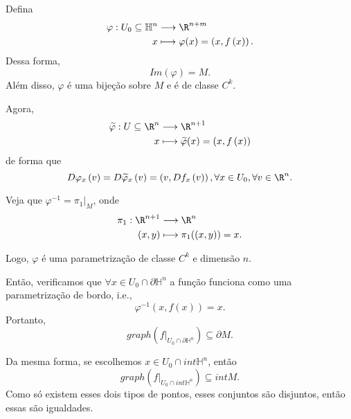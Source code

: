 \begin{demo}
    Defina
    \begin{align*}
        \varphi : U_0\subseteq\mathbb{H}^{n} &\longrightarrow \R^{n+m} \\
        x &\longmapsto \varphi (x) = \left( x, f\left( x \right)  \right)
    .\end{align*}
    Dessa forma, \[
    Im\left( \varphi  \right) = M
    .\] Além disso, $\varphi $ é uma bijeção sobre $M$ e é de classe $C^{k}$.

    Agora, 
    \begin{align*}
        \widetilde{\varphi }: U\subseteq\R^{n} &\longrightarrow \R^{n+1} \\
        x &\longmapsto \widetilde{\varphi }(x) = \left( x, f\left( x \right)  \right)
    \end{align*}
    de forma que \[
    D\varphi _x\left( v \right) = D \widetilde{\varphi }_x\left( v \right) = \left( v, Df_x\left( v \right)  \right), \forall x\in U_0, \forall v\in \R^{n}
    .\] 

    Veja que $\varphi ^{-1} = \pi_1\Big|_M$, onde
    \begin{align*}
        \pi_1: \R^{n+1} &\longrightarrow \R^{n} \\
        \left( x,y \right)  &\longmapsto \pi_1(\left( x,y \right) ) = x
    .\end{align*}

    Logo, $\varphi $ é uma parametrização de classe $C^{k}$ e dimensão $n$.

    Então, verificamos que $\forall x\in U_0\cap \partial \mathbb{H}^{n}$ a função funciona como uma parametrização de bordo, i.e., \[
    \varphi ^{-1}\left( x, f\left( x \right)  \right) = x
    .\] Portanto, \[
    graph\left( f\Big|_{U_0\cap \partial \mathbb{H}^{n}} \right) \subseteq \partial M
    .\] 

    Da mesma forma, se escolhemos $x \in U_0\cap int \mathbb{H}^{n}$, então \[
    graph\left( f\Big|_{U_0\cap int \mathbb{H}^{n}} \right) \subseteq int M
    .\] Como só existem esses dois tipos de pontos, esses conjuntos são disjuntos, então essas são igualdades.
\end{demo}

